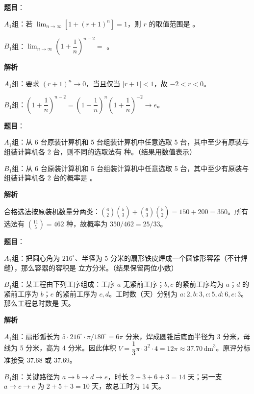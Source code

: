 \begin{answer}

\textbf{题目}：

$A_1$组：若 $\displaystyle\lim_{n\to\infty}\left[1+(r+1)^n\right]=1$，则 $r$ 的取值范围是 \gkblank{}。

$B_1$组：$\displaystyle\lim_{n\to\infty}\left(1+\dfrac1n\right)^{n-2}=$ \gkblank{}。

\textbf{解析}

$A_1$组：要求 $(r+1)^n\to0$，当且仅当 $|r+1|<1$，故 $-2<r<0$。

$B_1$组：$\left(1+\dfrac1n\right)^{n-2}=\left(1+\dfrac1n\right)^n\left(1+\dfrac1n\right)^{-2}\to e$。


\end{answer}
\begin{answer}

\textbf{题目}：

$A_1$组：从 6 台原装计算机和 5 台组装计算机中任意选取 5 台，其中至少有原装与组装计算机各 2 台，则不同的选取法有 \gkblank{} 种。（结果用数值表示）

$B_1$组：从 6 台原装计算机和 5 台组装计算机中任意选取 5 台，其中至少有原装与组装计算机各 2 台的概率是 \gkblank{}。

\textbf{解析}

合格选法按原装机数量分两类：$\binom62\binom53+\binom63\binom52=150+200=350$。所有选法有 $\binom{11}5=462$ 种，故概率为 $350/462=25/33$。


\end{answer}
\begin{answer}

\textbf{题目}：

$A_1$组：把圆心角为 $216^\circ$、半径为 5 分米的扇形铁皮焊成一个圆锥形容器（不计焊缝），那么容器的容积是 \gkblank{} 立方分米。（结果保留两位小数）

$B_1$组：某工程由下列工序组成：工序 $a$ 无紧前工序；$b,c$ 的紧前工序均为 $a$；$d$ 的紧前工序为 $b$；$e$ 的紧前工序为 $c,d$。工时数（天）分别为 $a:2,b:3,c:5,d:6,e:3$。那么工程总时数是 \gkblank{} 天。

\textbf{解析}

$A_1$组：扇形弧长为 $5\cdot216^\circ\cdot\pi/180^\circ=6\pi$ 分米，焊成圆锥后底面半径为 3 分米，母线为 5 分米，高为 4 分米。因此体积 $V=\dfrac13\pi\cdot3^2\cdot4=12\pi\approx37.70\,\mathrm{dm}^3$。原评分标准接受 37.68 或 37.69。

$B_1$组：关键路径为 $a\to b\to d\to e$，时长 $2+3+6+3=14$ 天；另一支 $a\to c\to e$ 为 $2+5+3=10$ 天，故总工时为 14 天。


\end{answer}

